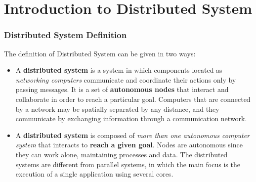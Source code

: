 \chapter{Introduction to Distributed System}
\subsection{Distributed System Definition}
The definition of Distributed System can be given in two ways:
\begin{itemize}
    \item A \textbf{distributed system} is a system in which components located as \textit{networking computers} communicate and coordinate their actions only by passing messages. It is a set of \textbf{autonomous nodes} that interact and collaborate in order to reach a particular goal. Computers that are connected by a network may be spatially separated by any distance, and they communicate by exchanging information through a communication network.
    \item A \textbf{distributed system} is composed of \textit{more than one autonomous computer system} that interacts to \textbf{reach a given goal}. Nodes are autonomous since they can work alone, maintaining processes and data. The distributed systems are different from parallel systems, in which the main focus is the execution of a single application using several cores.
\end{itemize}

